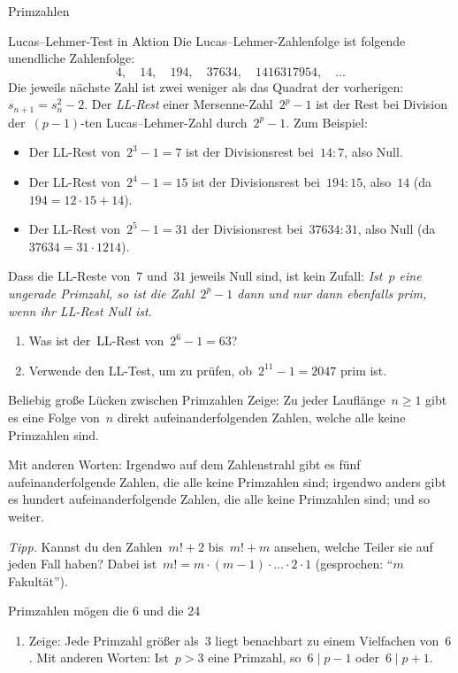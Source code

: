 \documentclass{uebblatt}
\begin{document}
\begin{blatt}{Primzahlen}
\begin{aufgabe}{Lucas--Lehmer-Test in Aktion}
Die Lucas--Lehmer-Zahlenfolge ist folgende unendliche Zahlenfolge:
\[ 4,\quad 14,\quad 194,\quad 37634,\quad 1416317954,\quad \ldots \]
Die jeweils nächste Zahl ist zwei weniger als das Quadrat der vorherigen: $s_{n+1} = s_n^2 - 2$.
Der \emph{LL-Rest} einer Mersenne-Zahl~$2^p-1$ ist der Rest bei Division
der~$(p-1)$-ten Lucas--Lehmer-Zahl durch~$2^p-1$. Zum Beispiel:
\begin{itemize}
\item Der LL-Rest von~$2^3 - 1 = 7$ ist der Divisionsrest bei~$14 :
7$, also Null.
\item Der LL-Rest von~$2^4 - 1 = 15$ ist der Divisionsrest bei~$194
: 15$, also~$14$ (da~$194 = 12 \cdot 15 + 14$).
\item Der LL-Rest von~$2^5 - 1 = 31$ der Divisionsrest bei~$37634 :
31$, also Null (da $37634 = 31 \cdot 1214$).
\end{itemize}
Dass die LL-Reste von~$7$ und~$31$ jeweils Null sind, ist kein Zufall:
\emph{Ist~$p$ eine ungerade Primzahl, so ist die Zahl~$2^p - 1$ dann und nur
dann ebenfalls prim, wenn ihr LL-Rest Null ist.}
\begin{enumerate}
\item Was ist der~LL-Rest von~$2^6 - 1 = 63$?
\item Verwende den LL-Test, um zu prüfen, ob~$2^{11} - 1 = 2047$ prim ist.
\end{enumerate}
\end{aufgabe}

\begin{aufgabe}{Beliebig große Lücken zwischen Primzahlen}
Zeige: Zu jeder Lauflänge~$n \geq 1$ gibt es eine Folge von~$n$ direkt
aufeinanderfolgenden Zahlen, welche alle keine Primzahlen sind.

Mit anderen Worten: Irgendwo auf dem Zahlenstrahl gibt es fünf
aufeinanderfolgende Zahlen, die alle keine Primzahlen sind; irgendwo anders
gibt es hundert aufeinanderfolgende Zahlen, die alle keine Primzahlen sind; und
so weiter.

{\scriptsize\emph{Tipp.} Kannst du den Zahlen~$m! + 2$ bis~$m! + m$ ansehen, welche Teiler
sie auf jeden Fall haben? Dabei ist~$m! = m \cdot (m-1) \cdot \ldots
\cdot 2 \cdot 1$ (gesprochen: "`$m$ Fakultät"').\par}
\end{aufgabe}

\begin{aufgabe}{Primzahlen mögen die 6 und die 24}
\begin{enumerate}
\item Zeige: Jede Primzahl größer als~$3$ liegt benachbart zu einem Vielfachen
von~$6$. Mit anderen Worten: Ist~$p > 3$ eine Primzahl, so~$6 \mid p - 1$
oder~$6 \mid p + 1$.


\end{enumerate}
\end{aufgabe}
\end{blatt}
\end{document}
